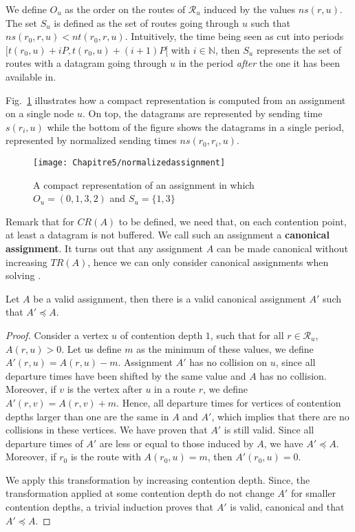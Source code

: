 We define $O_u$ as the order on the routes of $\mathcal{R}_u$ induced by the values $ns(r,u)$. The set $S_u$ is defined as the set of routes going through $u$ such that $ns(r_0,r,u) < nt(r_0,r,u)$. Intuitively, the time being seen as cut into periods $[t(r_0,u) + iP,t(r_0,u) + (i+1)P [$ with $i \in \mathbb{N}$, then $S_u$ represents the set of routes with a datagram going through $u$ in the period \emph{after} the one it has been available in. 

Fig.~\ref{fig:normalizedassignment} illustrates how a compact representation is computed from an assignment on a single node $u$. On top, the datagrams are represented by sending time $s(r_i,u)$ while the bottom of the figure shows the datagrams in a single period, represented by normalized sending times $ns(r_0,r_i,u)$.  
\begin{figure}[!h]
	\centering
	\texttt{[image: Chapitre5/normalizedassignment]}
\caption{A compact representation of an assignment in which $O_u = (0,1,3,2)$ and $S_u = \{1,3\}$ }
\label{fig:normalizedassignment}
\end{figure}


Remark that for $CR(A)$ to be defined, we need that, on each contention point, at least a datagram is not buffered. We call such an assignment a \textbf{canonical assignment}. It turns out that any assignment $A$ can be made canonical without increasing $TR(A)$, hence we can only consider canonical assignments when solving \spall.

\begin{lemma}\label{lemma:canonical_min}
Let $A$ be a valid assignment, then there is a valid canonical assignment $A'$ such that $A' \preceq A$.
\end{lemma}
\begin{proof}
Consider a vertex $u$ of contention depth $1$, such that for all $r \in \mathcal{R}_u$, $A(r,u) > 0$. Let us define $m$ as the minimum of these values, we define $A'(r,u) = A(r,u) - m$. Assignment $A'$ has no collision on $u$, since all departure times have been shifted by the same value and $A$ has no collision. Moreover, if $v$ is the vertex after $u$ in a route $r$, we define  $A'(r,v) = A(r,v) + m$. Hence, all departure times for vertices of contention depths larger than one are the same in $A$ and $A'$, which implies that there are no collisions in these vertices. We have proven that $A'$ is still valid. Since all departure times of $A'$ are less or equal to those induced by $A$, we have $A' \preceq A$. Moreover, if $r_0$ is the route with $A(r_0,u) = m$, then $A'(r_0,u) = 0$. 

We apply this transformation by increasing contention depth. Since, the transformation applied at some contention depth do not change $A'$ for smaller contention depths, a trivial induction proves that $A'$ is valid, canonical and that $A' \preceq A$.
\end{proof}


